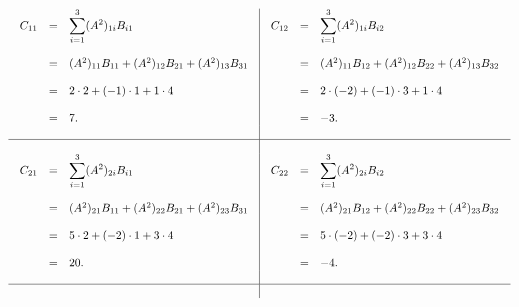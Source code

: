 \begin{enumerate}[1.]
       $$
       \begin{array}{c|c}
	   \begin{array}{rcl}
	       C_{11} &=& \displaystyle \sum_{i=1}^3 (A^2)_{1i}B_{i1}\\\\
		      &=& (A^2)_{11}B_{11} + (A^2)_{12}B_{21} + (A^2)_{13}B_{31}\\\\
		      &=& 2\cdot 2 + (-1)\cdot 1 + 1\cdot 4\\\\
		      &=& 7.
	   \end{array}
	   &
	   \begin{array}{rcl}
	       C_{12} &=& \displaystyle \sum_{i=1}^3 (A^2)_{1i}B_{i2}\\\\
		      &=& (A^2)_{11}B_{12} + (A^2)_{12}B_{22} + (A^2)_{13}B_{32}\\\\
		      &=& 2\cdot (-2) + (-1)\cdot 3 + 1\cdot 4\\\\
		      &=& -3.
	   \end{array}\\\\
	   \hline\\
	   \begin{array}{rcl}
	       C_{21} &=& \displaystyle \sum_{i=1}^3 (A^2)_{2i}B_{i1}\\\\
		      &=& (A^2)_{21}B_{11} + (A^2)_{22}B_{21} + (A^2)_{23}B_{31}\\\\
		      &=& 5\cdot 2 + (-2)\cdot 1 + 3\cdot 4\\\\
		      &=& 20.
	   \end{array}
	   &
	   \begin{array}{rcl}
	       C_{22} &=& \displaystyle \sum_{i=1}^3 (A^2)_{2i}B_{i2}\\\\
		      &=& (A^2)_{21}B_{12} + (A^2)_{22}B_{22} + (A^2)_{23}B_{32}\\\\
		      &=& 5\cdot (-2) + (-2)\cdot 3 + 3\cdot 4\\\\
		      &=& -4.
	    \end{array}\\\\
	   \hline\\

\end{array}$$
\end{enumerate}
